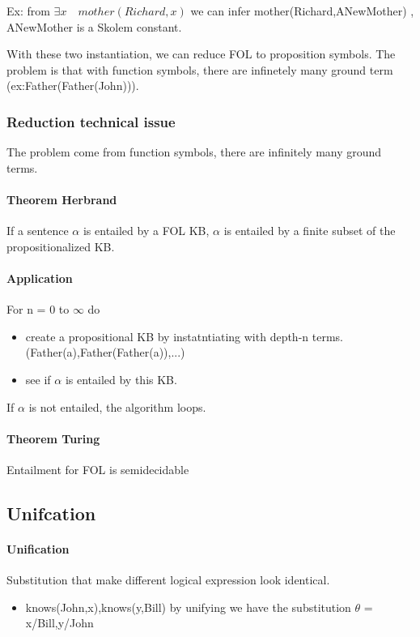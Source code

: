   Ex:   from   $\exists   x\quad   mother(Richard,x)$   we   can   infer
  mother(Richard,ANewMother) , ANewMother is a Skolem constant.

With these two instantiation, we  can reduce FOL to proposition symbols.
The problem  is that  with function symbols,  there are  infinetely many
ground term (ex:Father(Father(John))).

\subsubsection{Reduction technical issue}

The problem come from function symbols, there are infinitely many ground
terms.

\paragraph{Theorem Herbrand} If a sentence $\alpha$ is entailed by a FOL
KB, $\alpha$ is entailed by a finite subset of the propositionalized KB.

\paragraph{Application} For n = 0 to $\infty$ do 
	\begin{itemize}
        \item create a propositional KB  by instatntiating with depth-n terms.
(Father(a),Father(Father(a)),...)
		\item see if $\alpha$ is entailed by this KB.
	\end{itemize}

 If $\alpha$ is not entailed, the algorithm loops.

\paragraph{Theorem Turing} Entailment for FOL is semidecidable	

\subsection{Unifcation}

\paragraph{Unification}   Substitution  that   make  different   logical
expression look identical.
	\begin{itemize}
          \item knows(John,x),knows(y,Bill) by unifying we have the substitution
        $\theta$ = {x/Bill,y/John}
	\end{itemize}

